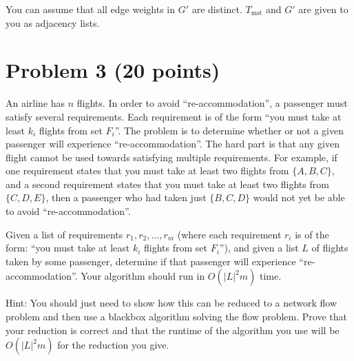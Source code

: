 \documentclass[letterpaper, 11pt]{article}
\begin{document}
You can assume that all edge weights in $G'$ are distinct. $T_{\text{mst}}$ and $G'$ are given to you as adjacency lists.






\section{Problem 3 (20 points)}
An airline has $n$ flights. In order to avoid ``re-accommodation'', a passenger must satisfy several requirements. Each requirement is of the form ``you must take at least $k_i$ flights from set $F_i$''. The problem is to determine whether or not a given passenger will experience ``re-accommodation''. The hard part is that any given flight cannot be used towards satisfying multiple requirements. For example, if one requirement states that you must take at least two flights from $\{A,B,C\}$, and a second requirement states that you must take at least two flights from $\{C,D,E\}$, then a passenger who had taken just $\{B,C,D\}$ would not yet be able to avoid ``re-accommodation''.

Given a list of requirements $r_1,r_2,\dots,r_m$ (where each requirement $r_i$ is of the form: ``you must take at least $k_i$ flights from set $F_i$''), and given a list $L$ of flights taken by some passenger, determine if that passenger will experience ``re-accommodation''. Your algorithm should run in $O(|L|^2m)$ time.

Hint: You should just need to show how this can be reduced to a network flow problem and then use a blackbox algorithm solving the flow problem. Prove that your reduction is correct and that the runtime of the algorithm you use will be $O(|L|^2m)$ for the reduction you give.
\end{document}
